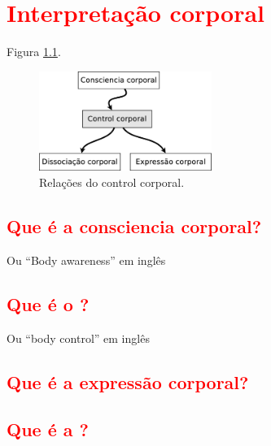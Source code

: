 

\chapter{\textcolor{red}{Interpretação corporal}}
\label{fig:bodyrelations}

Figura \ref{fig:bodycontroltotal}.

\begin{figure}[!h]
  \centering
    \includegraphics[width=0.5\textwidth]{chapters/cap-body/total.eps}
\caption{Relações do control corporal.}
\label{fig:bodycontroltotal}
\end{figure}


\section{\textcolor{red}{Que é a consciencia corporal?}}
Ou ``Body awareness'' em inglês 
\cite[pp. 11]{balcells2002expresion}
\cite{bueno2016psicomotricidade}
\cite[pp. 232]{gaiarsameio}
\cite[pp. 61]{aranha2002desenvolvimento}
\cite[pp. 75]{vallejo2001cuerpo}

\section{\textcolor{red}{Que é o \Bodycontrol?}}
 Ou ``body control'' em inglês 
\cite{bolio2006fantasia}
\cite[pp. 215]{moreno2008expresion}

\section{\textcolor{red}{Que é a expressão corporal?}}
\cite{balcells2002expresion}
\cite[pp. 215]{moreno2008expresion}

\section{\textcolor{red}{Que é a \bodyisolation?}}






